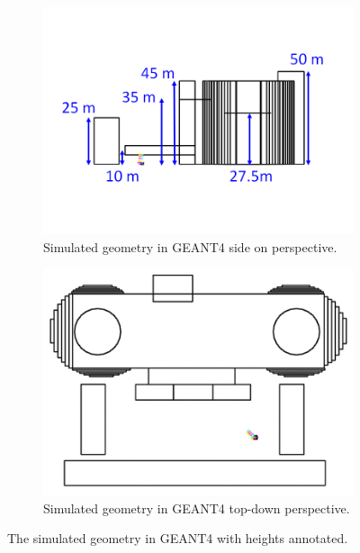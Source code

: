 \begin{figure}[!h]
\centering
\begin{subfigure}{.5\textwidth}
  \centering
  \includegraphics[width=\linewidth]{Chapter5/Figs/wylfaRasterNew/WylfaSimGeomSideOn.png}
  \captionsetup{width=.9\linewidth}
  \caption{Simulated geometry in GEANT4 side on perspective.}
  \label{subFig:WylfaSimGeomSideOn}
\end{subfigure}%
\begin{subfigure}{.5\textwidth}
  \centering
\includegraphics[width=\linewidth]{Chapter5/Figs/wylfaRasterNew/WylfaSimGeomTopDown.png}
  \captionsetup{width=.9\linewidth}
  \caption{Simulated geometry in GEANT4 top-down perspective.}
  \label{subFig:WylfaSimGeomTopDown}
\end{subfigure}
\caption{The simulated geometry in GEANT4 with heights annotated.}
\label{fig:WylfaSimGeom_SideOn_TopDown}
\end{figure}

